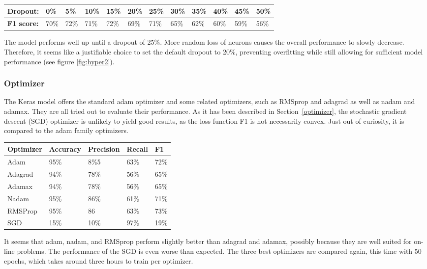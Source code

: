 \documentclass[
a4paper,
pagesize,
pdftex,
12pt,
twoside, %
BCOR=5mm, %
ngerman,
fleqn,
final,
]{scrartcl}
\begin{document}
	\begin{tabular} { | p{2cm} || p{0.7cm} | p{0.7cm} | p{0.7cm} | p{0.7cm}  | p{0.7cm} | p{0.7cm} | p{0.7cm} | p{0.7cm} | p{0.7cm} | p{0.7cm} | p{0.7cm} |}
		\hline
		\textbf{Dropout:}  & 0\% & 5\% & 10\% & 15\%   & 20\% & 25\% & 30\% & 35\% & 40\% & 45\% & 50\% \\   
		\hline
		\textbf{F1 score:} & 70\% & 72\% & 71\% & 72\% & 69\% & 71\% & 65\% & 62\% & 60\% & 59\% & 56\% \\
		\hline
		\hline
	\end{tabular}
	
	The model performs well up until a dropout of 25\%. More random loss of neurons causes the overall performance to slowly decrease. Therefore, it seems like a justifiable choice to set the default dropout to 20\%, preventing overfitting while still allowing for sufficient model performance (see figure \ref{fig:hyper2}).

	\subsubsection{Optimizer}
	
	The Keras model offers the standard adam optimizer and some related optimizers, such as RMSprop and adagrad as well as nadam and adamax. They are all tried out to evaluate their performance. As it has been described in Section~\ref{optimizer}, the stochastic gradient descent (SGD) optimizer is unlikely to yield good results, as the loss function F1 is not necessarily convex. Just out of curiosity, it is compared to the adam family optimizers. 
	
	\begin{tabular}{ | p{3cm} || p{2cm}|p{2cm}|p{2cm}|p{2cm}|  }
		\hline
		\textbf{Optimizer} & \textbf{Accuracy} & \textbf{Precision} & \textbf{Recall} & \textbf{F1} \\
		\hline
		Adam & 95\% &  8\%5 &  63\% &  72\% \\  
		Adagrad & 94\% &  78\% &  56\% &  65\% \\ 
		Adamax & 94\% &  78\% &  56\% &  65\% \\ 
		Nadam & 95\% &  86\% &  61\% &  71\% \\ 
		RMSProp & 95\% &  86 &  63\% &  73\% \\ 
		SGD & 15\% &  10\% &  97\% & 19\% \\
		\hline
		\hline
	\end{tabular}
	
	It seems that adam, nadam, and RMSprop perform slightly better than adagrad and adamax, possibly because they are well suited for on-line problems. The performance of the SGD is even worse than expected. The three best optimizers are compared again, this time with 50 epochs, which takes around three hours to train per optimizer.
	
\end{document}

